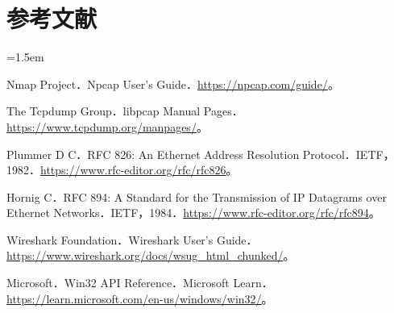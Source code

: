 \documentclass[UTF8,a4paper,11pt,scheme=chinese]{ctexart}
\begin{document}
\section{参考文献}
{\small\emergencystretch=1.5em
\begin{enumerate}[label={[\arabic*]},leftmargin=2.6em,itemsep=0em,topsep=0em]
\item Nmap Project．Npcap User's Guide．\url{https://npcap.com/guide/}。
\item The Tcpdump Group．libpcap Manual Pages．\url{https://www.tcpdump.org/manpages/}。
\item Plummer D C．RFC 826: An Ethernet Address Resolution Protocol．IETF，1982．\url{https://www.rfc-editor.org/rfc/rfc826}。
\item Hornig C．RFC 894: A Standard for the Transmission of IP Datagrams over Ethernet Networks．IETF，1984．\url{https://www.rfc-editor.org/rfc/rfc894}。
\item Wireshark Foundation．Wireshark User's Guide．\url{https://www.wireshark.org/docs/wsug_html_chunked/}。
\item Microsoft．Win32 API Reference．Microsoft Learn．\url{https://learn.microsoft.com/en-us/windows/win32/}。
\end{enumerate}
}
\end{document}
